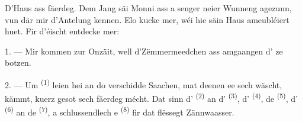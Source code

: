 %
%
%
%
%

\VUsaut{6.0mm}
\VUsaut{1.4mm}
\VUsaut{0.4mm}
\VUsaut{2.2mm}

D'Haus ass fäerdeg. Dem Jang säi Monni ass a senger neier Wunneng agezunn, vun där
mir d'Antelung kennen. Elo kucke mer, wéi hie säin Haus ameubléiert huet. Fir
d'éischt entdecke mer:

\VUsaut{3.0mm}

1. --- Mir kommen zur Onzäit, well d'Zëmmermeedchen ass amgaangen d'
ze botzen.

2. --- Um  \textsuperscript{(1)} leien hei an do verschidde
Saachen, mat deenen ee sech wäscht, kämmt, kuerz gesot sech fäerdeg mécht. Dat sinn
d' \textsuperscript{(2)} an d'
\textsuperscript{(3)}, d' \textsuperscript{(4)}, de
 \textsuperscript{(5)}, d' \textsuperscript{(6)} an de
 \textsuperscript{(7)}, a schlussendlech e 
\textsuperscript{(8)} fir dat flëssegt Zännwaasser.

